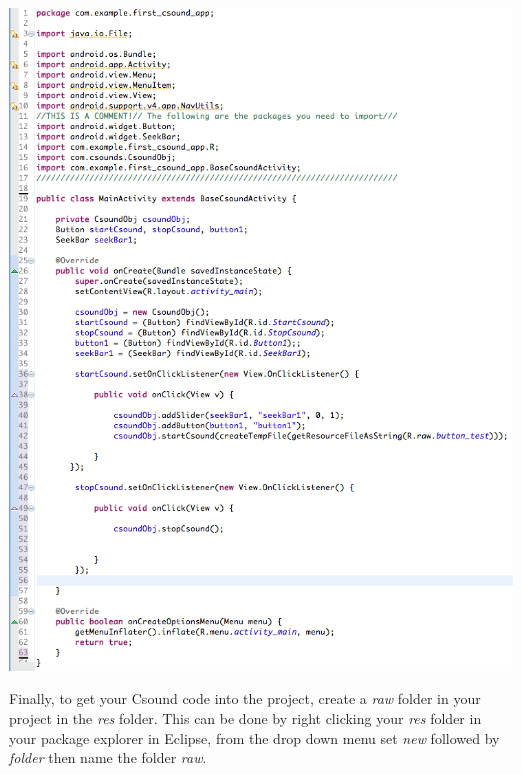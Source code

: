 \documentclass[11pt]{article}
\begin{document}
\begin{center}
\includegraphics[scale=0.50]{images/FinalActivity}
\end{center}

Finally, to get your Csound code into the project, create a \textit{raw} folder in your project in the \textit{res} folder. This can be done by right clicking your  \textit{res} folder in your package explorer in Eclipse, from the drop down menu set \textit{new} followed by \textit{folder} then name the folder  \textit{raw}. 
\end{document}
